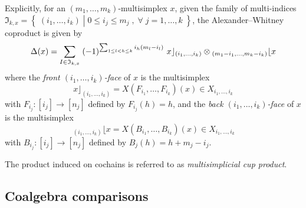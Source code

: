 Explicitly, for an $(m_1, \dots, m_k)$-multisimplex $x$, given the family of multi-indices $\mathfrak{I}_{k,x}=\left\lbrace \; (i_{1},\dots,i_{k}) \; \left| \; 0\le i_{j} \le m_{j} \; , \;  \forall \; j=1,\dots,k \; \right.  \right\rbrace $,  the Alexander--Whitney coproduct is given by
\[
\operatorname{\Delta}(x) =
\sum_{I\in \mathfrak{I}_{k,x}} \;  
(-1)^{\sum_{1 \leq l<h \leq k} i_h (m_l-i_l) } \
x \rfloor_{(i_{1},\dots,i_{k})} \otimes
\!\,_{(m_{1}-i_{1}, \dots, m_{k}-i_{k})} \lfloor x
\]
where the \textit{front $(i_1, \dots, i_k)$-face} of $x$ is the multisimplex
\[
x \rfloor_{(i_{1}, \dots, i_{k})} =
X(F_{i_1}, \dots, F_{i_k})(x) \in X_{i_1, \dots, i_k}
\]
with
$F_{i_j} \colon [i_j] \to [n_j]$ defined by $F_{i_j}(h)=h$, and the \textit{back $(i_1, \dots, i_k)$-face} of $x$ is the multisimplex
\[
\,_{(i_{1}, \dots, i_{k})} \lfloor x =
X(B_{i_1}, \dots, B_{i_k})(x) \in X_{i_1, \dots, i_k}
\]
with $B_{i_j} \colon [i_j] \to [n_j]$ defined by $B_j(h) = h+m_j-i_j$. 




The product induced on cochains is referred to as \textit{multisimplicial cup product}.

\subsection{Coalgebra comparisons}

